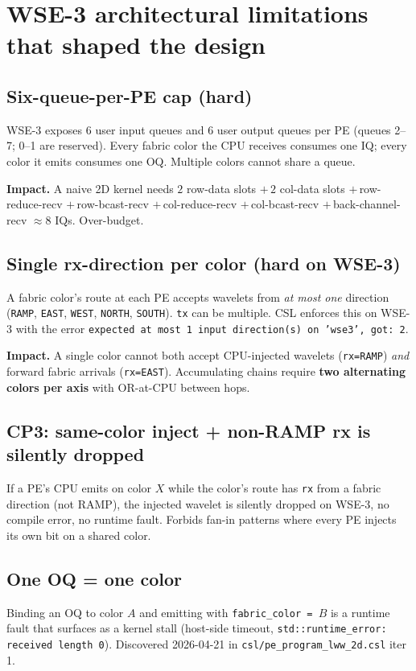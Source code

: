 \documentclass[11pt]{article}
\newcommand{\code}[1]{\texttt{#1}}
\newcommand{\file}[1]{\texttt{#1}}
\begin{document}
\section{WSE-3 architectural limitations that shaped the design}
\label{sec:overcome}

\subsection{Six-queue-per-PE cap (hard)}
WSE-3 exposes 6 user input queues and 6 user output queues per PE
(queues 2--7; 0--1 are reserved). Every fabric color the CPU
receives consumes one IQ; every color it emits consumes one OQ.
Multiple colors cannot share a queue.

\textbf{Impact.} A naive 2D kernel needs $2$ row-data slots $+\,2$
col-data slots $+\,$row-reduce-recv $+\,$row-bcast-recv
$+\,$col-reduce-recv $+\,$col-bcast-recv $+\,$back-channel-recv
$\approx 8$ IQs. Over-budget.

\subsection{Single rx-direction per color (hard on WSE-3)}
A fabric color's route at each PE accepts wavelets from \emph{at
most one} direction (\code{RAMP}, \code{EAST}, \code{WEST},
\code{NORTH}, \code{SOUTH}). \code{tx} can be multiple. CSL
enforces this on WSE-3 with the error
\code{expected at most 1 input direction(s) on 'wse3', got: 2}.

\textbf{Impact.} A single color cannot both accept CPU-injected
wavelets (\code{rx=RAMP}) \emph{and} forward fabric arrivals
(\code{rx=EAST}). Accumulating chains require
\textbf{two alternating colors per axis} with OR-at-CPU between
hops.

\subsection{CP3: same-color inject + non-RAMP rx is silently dropped}
If a PE's CPU emits on color $X$ while the color's route has
\code{rx} from a fabric direction (not RAMP), the injected wavelet
is silently dropped on WSE-3, no compile error, no runtime
fault. Forbids fan-in patterns where every PE injects its own
bit on a shared color.

\subsection{One OQ = one color}
Binding an OQ to color $A$ and emitting with
\code{fabric\_color = $B$} is a runtime fault that surfaces as a
kernel stall (host-side timeout, \code{std::runtime\_error: received
length 0}). Discovered 2026-04-21 in
\file{csl/pe\_program\_lww\_2d.csl} iter 1.
\end{document}
